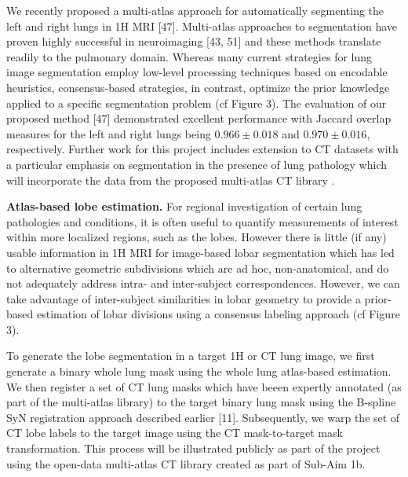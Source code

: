 \documentclass[11pt,]{article}
\begin{document}
We recently proposed a multi-atlas approach for automatically segmenting
the left and right lungs in 1H MRI {[}47{]}. Multi-atlas approaches to
segmentation have proven highly successful in neuroimaging {[}43, 51{]}
and these methods translate readily to the pulmonary domain. Whereas
many current strategies for lung image segmentation employ low-level
processing techniques based on encodable heuristics, consensus-based
strategies, in contrast, optimize the prior knowledge applied to a
specific segmentation problem (cf Figure 3). The evaluation of our
proposed method {[}47{]} demonstrated excellent performance with Jaccard
overlap measures for the left and right lungs being $0.966 \pm 0.018$
and $0.970 \pm 0.016$, respectively. Further work for this project
includes extension to CT datasets with a particular emphasis on
segmentation in the presence of lung pathology which will incorporate
the data from the proposed multi-atlas CT library .



\textbf{Atlas-based lobe estimation.} For regional investigation of
certain lung pathologies and conditions, it is often useful to quantify
measurements of interest within more localized regions, such as the
lobes. However there is little (if any) usable information in 1H MRI for
image-based lobar segmentation which has led to alternative geometric
subdivisions which are ad hoc, non-anatomical, and do not adequately
address intra- and inter-subject correspondences. However, we can take
advantage of inter-subject similarities in lobar geometry to provide a
prior-based estimation of lobar divisions using a consensus labeling
approach (cf Figure 3).

To generate the lobe segmentation in a target 1H or CT lung image, we
first generate a binary whole lung mask using the whole lung atlas-based
estimation. We then register a set of CT lung masks which have beeen
expertly annotated (as part of the multi-atlas library) to the target
binary lung mask using the B-spline SyN registration approach described
earlier {[}11{]}. Subsequently, we warp the set of CT lobe labels to the
target image using the CT mask-to-target mask transformation. This
process will be illustrated publicly as part of the project using the
open-data multi-atlas CT library created as part of Sub-Aim 1b.
\end{document}
